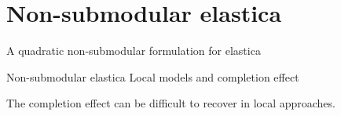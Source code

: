 \section{Non-submodular elastica}

\begin{frame}
\begin{center}
\huge
A quadratic non-submodular formulation for elastica
\end{center}
\end{frame}

\begin{frame}
{Non-submodular elastica}	
{Local models and completion effect}

\begin{minipage}[t][0.7\textheight][t]{1\textwidth}
\center

The completion effect can be difficult to recover in local approaches.\vspace{1em}


\end{minipage}
\end{frame}
